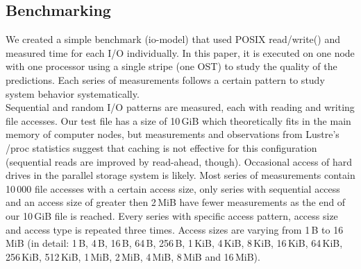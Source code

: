 \documentclass{superfri}
\begin{document}
\subsection{Benchmarking}
We created a simple benchmark (io-model) that used POSIX read/write() and measured time for each I/O individually.
In this paper, it is executed on one node with one processor using a single stripe (one OST) to study the quality of the predictions.
Each series of measurements follows a certain pattern to study system behavior systematically.\\
Sequential and random I/O patterns are measured, each with reading and writing file accesses.
Our test file has a size of 10\,GiB which theoretically fits in the main memory of computer nodes, but measurements and observations from Lustre's /proc statistics suggest that caching is not effective for this configuration (sequential reads are improved by read-ahead, though).
Occasional access of hard drives in the parallel storage system is likely.
Most series of measurements contain 10\,000 file accesses with a certain access size, only series with sequential access and an access size of greater then 2\,MiB have fewer measurements as the end of our 10\,GiB file is reached.
Every series with specific access pattern, access size and access type is repeated three times.
Access sizes are varying from 1\,B to 16\,MiB (in detail:  1\,B, 4\,B, 16\,B, 64\,B, 256\,B, 1\,KiB, 4\,KiB, 8\,KiB, 16\,KiB, 64\,KiB, 256\,KiB, 512\,KiB, 1\,MiB, 2\,MiB, 4\,MiB, 8\,MiB and 16\,MiB).
\end{document}
